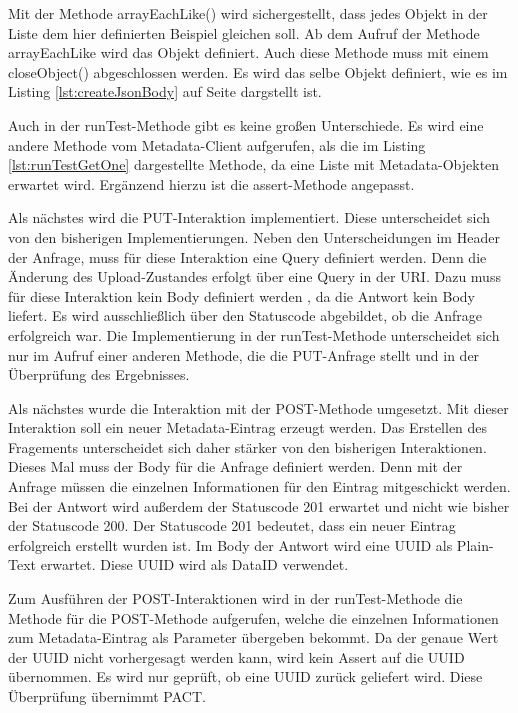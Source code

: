 \documentclass{llncs}
\begin{document}
Mit der Methode arrayEachLike() wird sichergestellt, dass jedes Objekt in der Liste dem hier definierten Beispiel gleichen soll. Ab dem Aufruf der Methode arrayEachLike wird das Objekt definiert. Auch diese Methode muss mit einem closeObject() abgeschlossen werden. Es wird das selbe Objekt definiert, wie es im Listing \ref{lst:createJsonBody} auf Seite \pageref{lst:createJsonBody} dargstellt ist.

Auch in der runTest-Methode gibt es keine großen Unterschiede. Es wird eine andere Methode vom Metadata-Client aufgerufen, als die im Listing \ref{lst:runTestGetOne} dargestellte Methode, da eine Liste mit Metadata-Objekten erwartet wird. Ergänzend hierzu ist die assert-Methode angepasst.

Als nächstes wird die PUT-Interaktion implementiert. Diese unterscheidet sich von den bisherigen Implementierungen. Neben den Unterscheidungen im Header der Anfrage, muss für diese Interaktion eine Query definiert werden. Denn die Änderung des Upload-Zustandes erfolgt über eine Query in der URI. 
Dazu muss für diese Interaktion kein Body definiert werden , da die Antwort kein Body liefert. Es wird ausschließlich über den Statuscode abgebildet, ob die Anfrage erfolgreich war.
Die Implementierung in der runTest-Methode unterscheidet sich nur im Aufruf einer anderen Methode, die die PUT-Anfrage stellt und in der Überprüfung des Ergebnisses.

Als nächstes wurde die Interaktion mit der POST-Methode umgesetzt. Mit dieser Interaktion soll ein neuer Metadata-Eintrag erzeugt werden. Das Erstellen des Fragements unterscheidet sich daher stärker von den bisherigen Interaktionen. Dieses Mal muss der Body für die Anfrage definiert werden. Denn mit der Anfrage müssen die einzelnen Informationen für den Eintrag mitgeschickt werden. Bei der Antwort wird außerdem der Statuscode 201 erwartet und nicht wie bisher der Statuscode 200. Der Statuscode 201 bedeutet, dass ein neuer Eintrag erfolgreich erstellt wurden ist. Im Body der Antwort wird eine UUID als Plain-Text erwartet. Diese UUID wird als DataID verwendet.

Zum Ausführen der POST-Interaktionen wird in der runTest-Methode die Methode für die POST-Methode aufgerufen, welche die einzelnen Informationen zum Metadata-Eintrag als Parameter übergeben bekommt. Da der genaue Wert der UUID nicht vorhergesagt werden kann, wird kein Assert auf die UUID übernommen. Es wird nur geprüft, ob eine UUID zurück geliefert wird. Diese Überprüfung übernimmt PACT.
\end{document}
